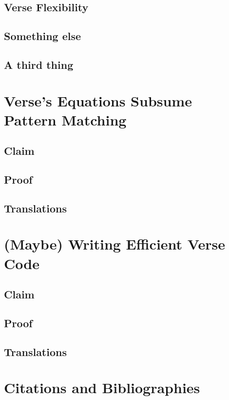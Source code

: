 \documentclass[manuscript,screen,review]{acmart}
\begin{document}
\subsection{Verse Flexibility}
\subsection{Something else}
\subsection{A third thing}

\section{Verse's Equations Subsume Pattern Matching}

\subsection{Claim}
\subsection{Proof}
\subsection{Translations}

\section{(Maybe) Writing Efficient Verse Code}

\subsection{Claim}
\subsection{Proof}
\subsection{Translations}


\section{Citations and Bibliographies}
\end{document}
